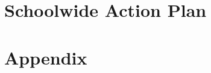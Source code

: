 \documentclass{report}
\begin{document}
\chapter{Schoolwide Action Plan}
\chapter{Appendix}
\listoffigures
\listoftables
\end{document}
